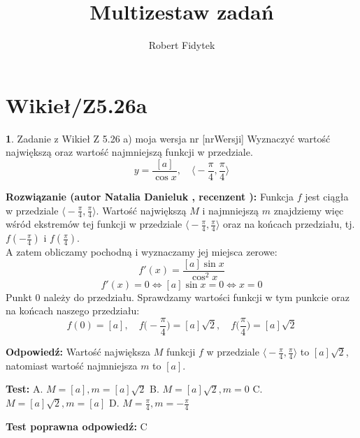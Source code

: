 \documentclass[12pt, a4paper]{article}
\title{Multizestaw zadań}
\author{Robert Fidytek}
\date{}
\theoremstyle{definition} %
\newtheorem{zad}{}
\newcommand{\kategoria}[1]{\section{#1}} %
\newcommand{\zadStart}[1]{\begin{zad}#1\newline} %
\newcommand{\zadStop}{\end{zad}}   %
\newcommand{\rozwStart}[2]{\noindent \textbf{Rozwiązanie (autor #1 , recenzent #2): }\newline} %
\newcommand{\rozwStop}{\newline}                                            %
\newcommand{\odpStart}{\noindent \textbf{Odpowiedź:}\newline}    %
\newcommand{\odpStop}{\newline}                                             %
\newcommand{\testStart}{\noindent \textbf{Test:}\newline} %
\newcommand{\testStop}{\newline} %
\newcommand{\kluczStart}{\noindent \textbf{Test poprawna odpowiedź:}\newline} %
\newcommand{\kluczStop}{\newline} %
\begin{document}
\maketitle

\kategoria{Wikieł/Z5.26a}

\zadStart{Zadanie z Wikieł Z 5.26 a) moja wersja nr [nrWersji]}
Wyznaczyć wartość największą oraz wartość najmniejszą funkcji w przedziale. 
$$y = \frac{[a]}{\cos x}, \quad \big\langle-\frac{\pi}{4},\frac{\pi}{4}\big\rangle$$
\zadStop

\rozwStart{Natalia Danieluk}{}
Funkcja $f$ jest ciągła w przedziale $\big\langle-\frac{\pi}{4},\frac{\pi}{4}\big\rangle$. Wartość największą $M$ i najmniejszą $m$ znajdziemy więc wśród ekstremów tej funkcji w przedziale $\big\langle-\frac{\pi}{4},\frac{\pi}{4}\big\rangle$ oraz na końcach przedziału, tj. $f(-\frac{\pi}{4})$ i $f(\frac{\pi}{4})$. \\
A zatem obliczamy pochodną i wyznaczamy jej miejsca zerowe:
$$ f'(x) = \frac{[a] \sin x}{\cos^2 x} $$
$$ f'(x) = 0 \Leftrightarrow [a] \sin x = 0 \Leftrightarrow x = 0 $$ 
Punkt $0$ należy do przedziału. Sprawdzamy wartości funkcji w tym punkcie oraz na końcach naszego przedziału: \\
$$ f(0) = [a],\quad f\big(-\frac{\pi}{4}\big) = [a]\sqrt{2},\quad f\big(\frac{\pi}{4}\big) = [a]\sqrt{2} $$
\rozwStop

\odpStart
Wartość największa $M$ funkcji $f$ w przedziale $\big\langle-\frac{\pi}{4},\frac{\pi}{4}\big\rangle$ to $[a]\sqrt{2}$, natomiast wartość najmniejsza $m$ to $[a]$.
\odpStop

\testStart
A. $M=[a], m=[a]\sqrt{2}$
B. $M=[a]\sqrt{2}, m=0$
C. $M=[a]\sqrt{2}, m=[a]$
D. $M=\frac{\pi}{4}, m=-\frac{\pi}{4}$
\testStop

\kluczStart
C
\kluczStop
\end{document}
